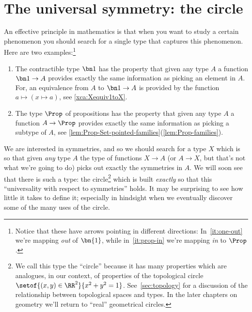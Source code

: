 \chapter{The universal symmetry: the circle}
\label{cha:circle}

An effective principle in mathematics is that when you want to study a certain
phenomenon you should search for a single type that captures this phenomenon.
Here are two examples:\footnote{%
  Notice that these have arrows pointing in different directions:
  In~\cref{it:one-out} we're mapping \emph{out} of $\bn{1}$,
  while in~\cref{it:prop-in} we're mapping \emph{in} to $\Prop$.}
\begin{enumerate}
\item\label{it:one-out}
  The contractible type $\bn 1$ has the property that given
any type $A$ a function $\bn 1\to A$ provides exactly the
same information as picking an element in $A$.
For, an equivalence from $A$ to $\bn 1\to A$ is provided by
the function $a \mapsto (x \mapsto a)$, see \cref{xca:Xequiv1toX}.
\item\label{it:prop-in}
  The type $\Prop$ of propositions has the property that
given any type $A$ a function $A\to\Prop$ provides exactly
the same information as picking a subtype of $A$,
see \cref{lem:Prop-Set-pointed-families}(\ref{lem:Prop-families}).
\end{enumerate}
We are interested in symmetries, and so we should search for a type $X$
which is so that given \emph{any} type $A$ the type of functions
$X\to A$ (or $A\to X$, but that's not what we're going to do)
picks out exactly the symmetries in $A$.
We will soon see that there is such a type:
the circle\footnote{%
  We call this type the ``circle''
  because it has many properties which are analogues, in our context, of properties of
  the topological circle $\setof{(x,y)\in\RR^2}{x^2+y^2=1}$.
  See~\cref{sec:topology} for a discussion of the relationship
  between topological spaces and types.
  In the later chapters on geometry we'll return
  to ``real'' geometrical circles.}
which is built \emph{exactly} so that this
``universality with respect to symmetries'' holds.
It may be surprising to see how little it takes to define it;
especially in hindsight when we eventually discover some of the many uses of the circle.

